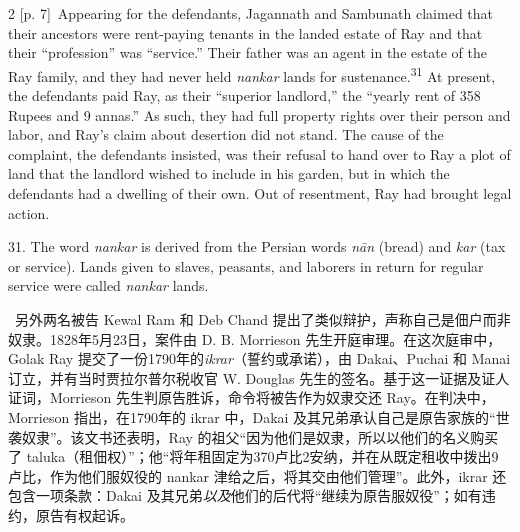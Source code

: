 \documentclass[10pt,a4paper]{article}
\begin{document}
\begin{paracol}{2}
\switchcolumn
{\scriptsize\color{gray} [p. 7]}\ Appearing for the defendants, Jagannath and Sambunath claimed that their ancestors were rent-paying tenants in the landed estate of Ray and that their “profession” was “service.” Their father was an agent in the estate of the Ray family, and they had never held \textit{nankar} lands for sustenance.\nobreak\textsuperscript{31} At present, the defendants paid Ray, as their “superior landlord,” the “yearly rent of 358 Rupees and 9 annas.” As such, they had full property rights over their person and labor, and Ray’s claim about desertion did not stand. The cause of the complaint, the defendants insisted, was their refusal to hand over to Ray a plot of land that the landlord wished to include in his garden, but in which the defendants had a dwelling of their own. Out of resentment, Ray had brought legal action.\par{\small 31. The word \textit{nankar} is derived from the Persian words \textit{nān} (bread) and \textit{kar} (tax or service). Lands given to slaves, peasants, and laborers in return for regular service were called \textit{nankar} lands.\par}
\switchcolumn*
{\scriptsize\color{gray} [p. 7]}\ 另外两名被告 Kewal Ram 和 Deb Chand 提出了类似辩护，声称自己是佃户而非奴隶。1828年5月23日，案件由 D. B. Morrieson 先生开庭审理。在这次庭审中，Golak Ray 提交了一份1790年的\textit{ikrar}（誓约或承诺），由 Dakai、Puchai 和 Manai 订立，并有当时贾拉尔普尔税收官 W. Douglas 先生的签名。基于这一证据及证人证词，Morrieson 先生判原告胜诉，命令将被告作为奴隶交还 Ray。在判决中，Morrieson 指出，在1790年的 ikrar 中，Dakai 及其兄弟承认自己是原告家族的“世袭奴隶”。该文书还表明，Ray 的祖父“因为他们是奴隶，所以以他们的名义购买了 taluka（租佃权）”；他“将年租固定为370卢比2安纳，并在从既定租收中拨出9卢比，作为他们服奴役的 nankar 津给之后，将其交由他们管理”。此外，ikrar 还包含一项条款：Dakai 及其兄弟\textit{以及}他们的后代将“继续为原告服奴役”；如有违约，原告有权起诉。\par
\switchcolumn

\end{paracol}
\end{document}

